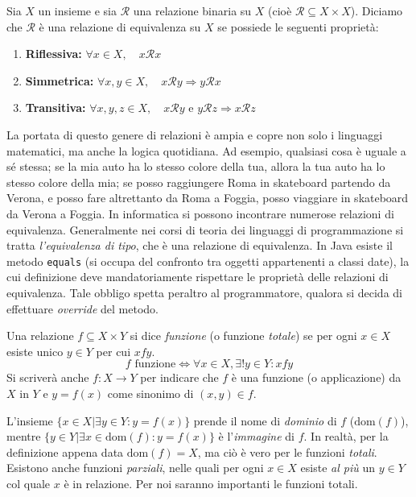 \documentclass[oneside]{book}
\theoremstyle{remark}
\begin{document}
\begin{tcolorbox}[colback=yellow!30, colframe=yellow!30!black, title={Relazione di equivalenza}]
Sia $X$ un insieme e sia $\mathcal{R}$ una relazione binaria su $X$
(cioè $\mathcal{R} \subseteq X \times X$). Diciamo che $\mathcal{R}$ è una
relazione di equivalenza su $X$ se possiede le seguenti proprietà:
\begin{enumerate}
    \item \textbf{Riflessiva:} $\forall x \in X, \quad x \mathcal{R} x$
    \item \textbf{Simmetrica:} $\forall x,y \in X, \quad x \mathcal{R}y \Longrightarrow y \mathcal{R} x$
    \item \textbf{Transitiva:} $\forall x,y,z \in X, \quad x \mathcal{R} y \text{ e } y \mathcal{R} z \Longrightarrow x \mathcal{R} z$
\end{enumerate}
\end{tcolorbox}

\noindent La portata di questo genere di relazioni è ampia e copre non solo i linguaggi
matematici, ma anche la logica quotidiana. Ad esempio, qualsiasi cosa è uguale
a sé stessa; se la mia auto ha lo stesso colore della tua, allora la tua auto ha lo stesso
colore della mia; se posso raggiungere Roma in skateboard partendo da Verona,
e posso fare altrettanto da Roma a Foggia, posso viaggiare in skateboard da
Verona a Foggia. In informatica si possono incontrare numerose relazioni di
equivalenza. Generalmente nei corsi di teoria dei linguaggi di programmazione
si tratta \textit{l'equivalenza di tipo}, che è una relazione di equivalenza.
In Java esiste il metodo \texttt{equals} (si occupa del confronto tra oggetti
appartenenti a classi date), la cui definizione deve mandatoriamente
rispettare le proprietà delle relazioni di equivalenza. Tale obbligo spetta
peraltro al programmatore, qualora si decida di effettuare \textit{override}
del metodo.

\begin{tcolorbox}[colback=yellow!30, colframe=yellow!30!black, title={Funzione}]
Una relazione $f\subseteq X\times Y$ si dice \textit{funzione} (o funzione
\textit{totale}) se per ogni $x\in X$ esiste unico $y\in Y$ per cui $xfy$.
\[ f \text{ funzione} \Longleftrightarrow \forall x\in X,\exists!y\in Y:xfy \]
Si scriverà anche $f:X\to Y$ per indicare che $f$ è una funzione (o applicazione)
da $X$ in $Y$ e $y=f(x)$ come sinonimo di $(x,y)\in f$.
\end{tcolorbox}

L'insieme $\{x\in X|\exists y\in Y: y=f(x)\}$ prende il nome di \textit{dominio}
di $f$ ($\text{dom}(f)$), mentre $\{y\in Y|\exists x\in\text{dom}(f):y=f(x)\}$
è l'\textit{immagine} di $f$. In realtà, per la definizione appena data
$\text{dom}(f)=X$, ma ciò è vero per le funzioni \textit{totali}. Esistono
anche funzioni \textit{parziali}, nelle quali per ogni $x\in X$ esiste \textit{al più}
un $y\in Y$ col quale $x$ è in relazione. Per noi saranno importanti le funzioni
totali.
\end{document}
